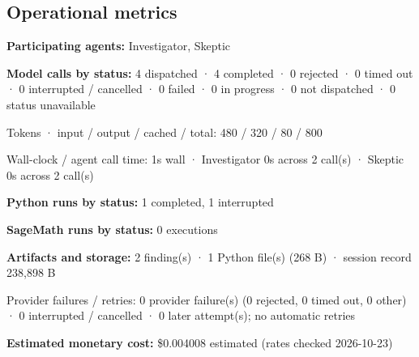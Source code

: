 \documentclass[11pt]{article}
\begin{document}
\subsection{Operational metrics}
\textbf{Participating agents:} Investigator, Skeptic\par
\textbf{Model calls by status:} 4 dispatched · 4 completed · 0 rejected · 0 timed out · 0 interrupted / cancelled · 0 failed · 0 in progress · 0 not dispatched · 0 status unavailable\par
Tokens · input / output / cached / total: 480 / 320 / 80 / 800\par
Wall-clock / agent call time: 1s wall · Investigator 0s across 2 call(s) · Skeptic 0s across 2 call(s)\par
\textbf{Python runs by status:} 1 completed, 1 interrupted\par
\textbf{SageMath runs by status:} 0 executions\par
\textbf{Artifacts and storage:} 2 finding(s) · 1 Python file(s) (268 B) · session record 238,898 B\par
Provider failures / retries: 0 provider failure(s) (0 rejected, 0 timed out, 0 other) · 0 interrupted / cancelled · 0 later attempt(s); no automatic retries\par
\textbf{Estimated monetary cost:} \$0.004008 estimated (rates checked 2026-10-23)\par
\end{document}
